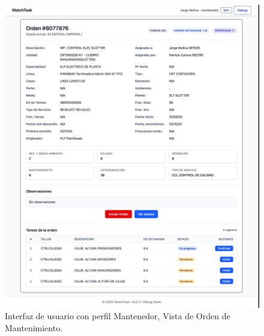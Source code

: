 \documentclass[12pt,a4paper]{report}
\begin{document}
\begin{figure}[h]
    \centering
    \includegraphics[width=1\textwidth]{data/Mantenedor_Orden.png}
    \caption[\,Mantenedor: Vista de Orden]{Interfaz de usuario con perfil Mantenedor, Vista de Orden de Mantenimiento.}
    \label{fig:[Mantenedor_Orden]}
\end{figure}
\end{document}
